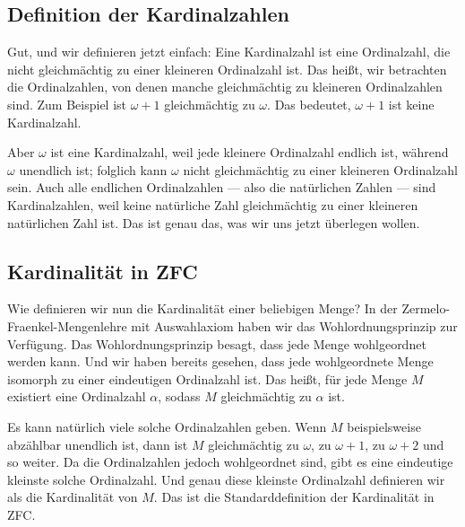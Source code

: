 \subsection{Definition der Kardinalzahlen}

\begin{spoken-clean}[00:54:37 - 00:55:45]
Gut, und wir definieren jetzt einfach: Eine Kardinalzahl ist eine Ordinalzahl, die nicht gleichmächtig zu einer kleineren Ordinalzahl ist. Das heißt, wir betrachten die Ordinalzahlen, von denen manche gleichmächtig zu kleineren Ordinalzahlen sind. Zum Beispiel ist $\omega + 1$ gleichmächtig zu $\omega$. Das bedeutet, $\omega + 1$ ist keine Kardinalzahl.

Aber $\omega$ ist eine Kardinalzahl, weil jede kleinere Ordinalzahl endlich ist, während $\omega$ unendlich ist; folglich kann $\omega$ nicht gleichmächtig zu einer kleineren Ordinalzahl sein. Auch alle endlichen Ordinalzahlen --- also die natürlichen Zahlen --- sind Kardinalzahlen, weil keine natürliche Zahl gleichmächtig zu einer kleineren natürlichen Zahl ist. Das ist genau das, was wir uns jetzt überlegen wollen.
\end{spoken-clean}

\begin{math-stroke}
\end{math-stroke}

\subsection{Kardinalität in ZFC}

\begin{spoken-clean}[00:55:45 - 00:57:32]
Wie definieren wir nun die Kardinalität einer beliebigen Menge? In der Zermelo-Fraenkel-Mengenlehre mit Auswahlaxiom haben wir das Wohlordnungsprinzip zur Verfügung. Das Wohlordnungsprinzip besagt, dass jede Menge wohlgeordnet werden kann. Und wir haben bereits gesehen, dass jede wohlgeordnete Menge isomorph zu einer eindeutigen Ordinalzahl ist. Das heißt, für jede Menge $M$ existiert eine Ordinalzahl $\alpha$, sodass $M$ gleichmächtig zu $\alpha$ ist.

Es kann natürlich viele solche Ordinalzahlen geben. Wenn $M$ beispielsweise abzählbar unendlich ist, dann ist $M$ gleichmächtig zu $\omega$, zu $\omega + 1$, zu $\omega + 2$ und so weiter. Da die Ordinalzahlen jedoch wohlgeordnet sind, gibt es eine eindeutige kleinste solche Ordinalzahl. Und genau diese kleinste Ordinalzahl definieren wir als die Kardinalität von $M$. Das ist die Standarddefinition der Kardinalität in ZFC.
\end{spoken-clean}

